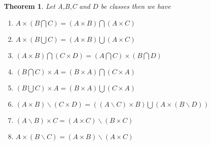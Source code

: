 \documentclass{book}
\newtheorem{theorem}{Theorem}
\begin{document}
\begin{theorem}
  \label{cartesian product properties (1)}Let A,B,C and $D$ be classes then we
  have
  \begin{enumerate}
    \item $A \times \left( B \bigcap C \right) = (A \times B) \bigcap (A
    \times C)$
    
    \item $A \times \left( B \bigcup C \right) = (A \times B) \bigcup (A
    \times C)$
    
    \item $(A \times B) \bigcap (C \times D) = \left( A \bigcap C \right)
    \times \left( B \bigcap D \right)$
    
    \item $\left( B \bigcap C \right) \times A = (B \times A) \bigcap (C
    \times A)$
    
    \item $\left( B \bigcup C \right) \times A = (B \times A) \bigcup (C
    \times A)$
    
    \item $(A \times B) \backslash (C \times D) = ((A\backslash C) \times B)
    \bigcup (A \times (B\backslash D))$
    
    \item $(A\backslash B) \times C = (A \times C) \backslash (B \times C)$
    
    \item $A \times (B\backslash C) = (A \times B) \backslash (A \times C)$
  \end{enumerate}
\end{theorem}
\end{document}
